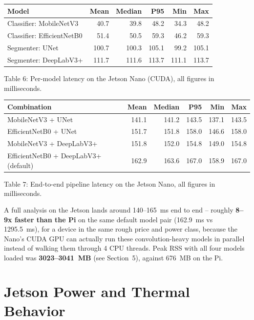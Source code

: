 \documentclass[11pt]{article}
\begin{document}
\begin{center}
\begin{tabular}{lrrrrr}
\toprule
Model & Mean & Median & P95 & Min & Max \\
\midrule
Classifier: MobileNetV3 & 40.7 & 39.8 & 48.2 & 34.3 & 48.2 \\
Classifier: EfficientNetB0 & 51.4 & 50.5 & 59.3 & 46.2 & 59.3 \\
Segmenter: UNet & 100.7 & 100.3 & 105.1 & 99.2 & 105.1 \\
Segmenter: DeepLabV3+ & 111.7 & 111.6 & 113.7 & 111.1 & 113.7 \\
\bottomrule
\end{tabular}
\end{center}
\begin{center}\small Table 6: Per-model latency on the Jetson Nano (CUDA), all figures in milliseconds.\end{center}

\begin{center}
\begin{tabular}{lrrrrr}
\toprule
Combination & Mean & Median & P95 & Min & Max \\
\midrule
MobileNetV3 + UNet & 141.1 & 141.2 & 143.5 & 137.1 & 143.5 \\
EfficientNetB0 + UNet & 151.7 & 151.8 & 158.0 & 146.6 & 158.0 \\
MobileNetV3 + DeepLabV3+ & 151.8 & 152.0 & 154.8 & 149.0 & 154.8 \\
EfficientNetB0 + DeepLabV3+ (default) & 162.9 & 163.6 & 167.0 & 158.9 & 167.0 \\
\bottomrule
\end{tabular}
\end{center}
\begin{center}\small Table 7: End-to-end pipeline latency on the Jetson Nano, all figures in milliseconds.\end{center}

A full analysis on the Jetson lands around 140--165~ms end to end -- roughly
\textbf{8--9x faster than the Pi} on the same default model pair (162.9~ms vs
1295.5~ms), for a device in the same rough price and power class, because the Nano's
CUDA GPU can actually run these convolution-heavy models in parallel instead of walking
them through 4 CPU threads. Peak RSS with all four models loaded was
\textbf{3023--3041~MB} (see Section~5), against 676~MB on the Pi.

\section{Jetson Power and Thermal Behavior}
\label{sec:jetson-power}
\end{document}

